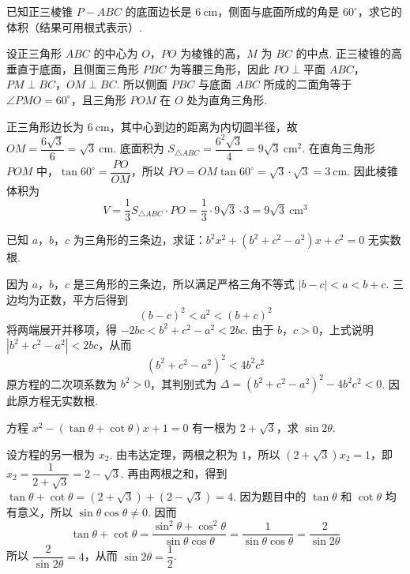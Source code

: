 \begin{problem}
已知正三棱锥 \(P-ABC\) 的底面边长是 \(6\mathrm{~cm}\)，侧面与底面所成的角是 \(60^\circ\)，求它的体积（结果可用根式表示）.
\end{problem}

\begin{solution}
设正三角形 \(ABC\) 的中心为 \(O\)，\(PO\) 为棱锥的高，\(M\) 为 \(BC\) 的中点. 正三棱锥的高垂直于底面，且侧面三角形 \(PBC\) 为等腰三角形，因此 \(PO\perp\text{平面 }ABC\)，\(PM\perp BC\)，\(OM\perp BC\).
所以侧面 \(PBC\) 与底面 \(ABC\) 所成的二面角等于 \(\angle PMO=60^\circ\)，且三角形 \(POM\) 在 \(O\) 处为直角三角形.

正三角形边长为 \(6\mathrm{~cm}\)，其中心到边的距离为内切圆半径，故 \(OM=\dfrac{6\sqrt3}{6}=\sqrt3\mathrm{~cm}\). 底面积为 \(S_{\triangle ABC}=\dfrac{6^2\sqrt3}{4}=9\sqrt3\mathrm{~cm}^2\). 在直角三角形 \(POM\) 中，\(\tan60^\circ=\dfrac{PO}{OM}\)，所以 \(PO=OM\tan60^\circ=\sqrt3\cdot\sqrt3=3\mathrm{~cm}\).
因此棱锥体积为
\[
V=\dfrac13S_{\triangle ABC}\cdot PO=\dfrac13\cdot9\sqrt3\cdot3=9\sqrt3\mathrm{~cm}^3
\]
\end{solution}

\begin{problem}
已知 \(a\)，\(b\)，\(c\) 为三角形的三条边，求证：\(b^2x^2+\left(b^2+c^2-a^2\right)x+c^2=0\) 无实数根.
\end{problem}

\begin{solution}
因为 \(a\)，\(b\)，\(c\) 是三角形的三条边，所以满足严格三角不等式 \(\left|b-c\right|<a<b+c\). 三边均为正数，平方后得到
\[
\left(b-c\right)^2<a^2<\left(b+c\right)^2
\]
将两端展开并移项，得 \(-2bc<b^2+c^2-a^2<2bc\). 由于 \(b\)，\(c>0\)，上式说明 \(\left|b^2+c^2-a^2\right|<2bc\)，从而
\[
\left(b^2+c^2-a^2\right)^2<4b^2c^2
\]
原方程的二次项系数为 \(b^2>0\)，其判别式为 \(\Delta=\left(b^2+c^2-a^2\right)^2-4b^2c^2<0\).
因此原方程无实数根.
\end{solution}

\begin{problem}
方程 \(x^2-\left(\tan\theta+\cot\theta\right)x+1=0\) 有一根为 \(2+\sqrt3\)，求 \(\sin 2\theta\).
\end{problem}

\begin{solution}
设方程的另一根为 \(x_2\). 由韦达定理，两根之积为 \(1\)，所以 \(\left(2+\sqrt3\right)x_2=1\)，即 \(x_2=\dfrac{1}{2+\sqrt3}=2-\sqrt3\). 再由两根之和，得到 \(\tan\theta+\cot\theta=\left(2+\sqrt3\right)+\left(2-\sqrt3\right)=4\). 因为题目中的 \(\tan\theta\) 和 \(\cot\theta\) 均有意义，所以 \(\sin\theta\cos\theta\ne0\). 因而
\[
\tan\theta+\cot\theta=\dfrac{\sin^2\theta+\cos^2\theta}{\sin\theta\cos\theta}=\dfrac{1}{\sin\theta\cos\theta}=\dfrac{2}{\sin2\theta}
\]
所以 \(\dfrac{2}{\sin2\theta}=4\)，从而 \(\sin2\theta=\dfrac12\).
\end{solution}

